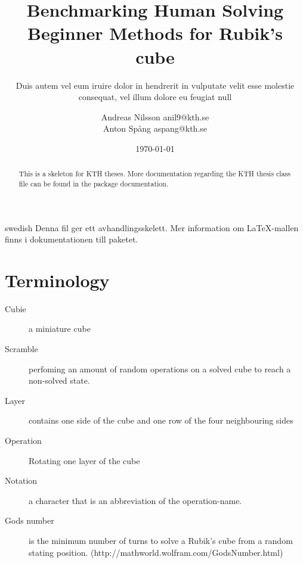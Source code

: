 \documentclass[a4paper,11pt]{kth-mag}
\title{Benchmarking Human Solving Beginner Methods for
           Rubik's cube}
\subtitle{Duis autem vel eum iruire dolor in hendrerit in
          vulputate velit esse molestie consequat, vel illum
          dolore eu feugiat null}
\author{Andreas Nilsson  anil9@kth.se\\Anton Spång  aspang@kth.se}
\date{\today}
\begin{document}
\frontmatter
\pagestyle{empty}
\removepagenumbers
\maketitle
{}
\begin{abstract}
  This is a skeleton for KTH theses. More documentation
  regarding the KTH thesis class file can be found in
  the package documentation.


\end{abstract}
\clearpage
\begin{foreignabstract}{swedish}
  Denna fil ger ett avhandlingsskelett.
  Mer information om \LaTeX-mallen finns i
  dokumentationen till paketet.
\end{foreignabstract}

\clearpage
\tableofcontents*
\mainmatter
\section{Terminology} 
	\begin{description}
		\item[Cubie] a miniature cube
		\item[Scramble] perfoming an amount of random operations on a solved cube to reach a non-solved state.
		\item[Layer] contains one side of the cube and one row of the four neighbouring sides 
		\item[Operation] Rotating one layer of the cube
		\item[Notation] a character that is an abbreviation of the operation-name.
		\item[Gods number] is the minimum number of turns to solve a Rubik's cube from a random stating position. (http://mathworld.wolfram.com/GodsNumber.html)
	\end{description}

\pagestyle{newchap}
\end{document}
